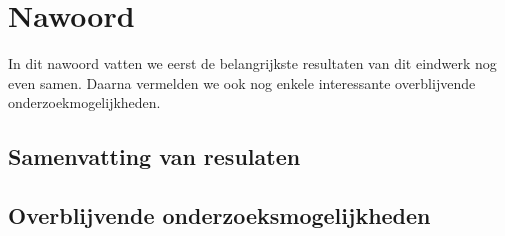 \chapter{Nawoord}

In dit nawoord vatten we eerst de belangrijkste resultaten van dit eindwerk
nog even samen. Daarna vermelden we ook nog enkele interessante overblijvende
onderzoekmogelijkheden.

\section*{Samenvatting van resulaten}

\section*{Overblijvende onderzoeksmogelijkheden}